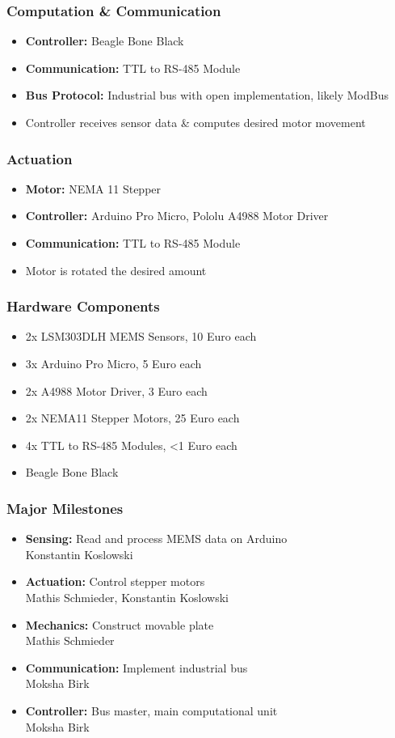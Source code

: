 \documentclass{beamer}
\begin{document}
\begin{frame}
	\frametitle{Computation \& Communication}
	\begin{itemize}
		\item \textbf{Controller:} Beagle Bone Black
		\item \textbf{Communication:} TTL to RS-485 Module
		\item \textbf{Bus Protocol:} Industrial bus with open implementation, likely ModBus
		\item Controller receives sensor data \& computes desired motor movement
	\end{itemize}
\end{frame}

\begin{frame}
	\frametitle{Actuation}
	\begin{itemize}
		\item \textbf{Motor:} NEMA 11 Stepper
		\item \textbf{Controller:} Arduino Pro Micro, Pololu A4988 Motor Driver
		\item \textbf{Communication:} TTL to RS-485 Module
		\item Motor is rotated the desired amount
	\end{itemize}
\end{frame}

\begin{frame}
  \frametitle{Hardware Components}
	\begin{itemize}
		\item 2x LSM303DLH MEMS Sensors, 10 Euro each
		\item 3x Arduino Pro Micro,  5 Euro each
		\item 2x A4988 Motor Driver, 3 Euro each
		\item 2x NEMA11 Stepper Motors, 25 Euro each
		\item 4x TTL to RS-485 Modules, <1 Euro each
		\item Beagle Bone Black
	\end{itemize}
\end{frame}

\begin{frame}
  \frametitle{Major Milestones}
	\begin{itemize}
		\item \textbf{Sensing:} Read and process MEMS data on Arduino\\
			\small{Konstantin Koslowski}
		\item \textbf{Actuation:} Control stepper motors\\
			\small{Mathis Schmieder, Konstantin Koslowski}
		\item \textbf{Mechanics:} Construct movable plate\\
			\small{Mathis Schmieder}
		\item \textbf{Communication:} Implement industrial bus\\
			\small{Moksha Birk}
		\item \textbf{Controller:} Bus master, main computational unit\\
			\small{Moksha Birk}
	\end{itemize}
\end{frame}
\end{document}
